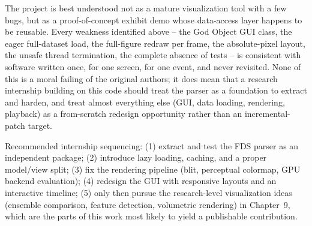 \documentclass[11pt,a4paper]{report}
\begin{document}
\begin{interpbox}
The project is best understood not as a mature visualization tool with a few bugs, but as a
proof-of-concept exhibit demo whose data-access layer happens to be reusable. Every weakness
identified above -- the God Object GUI class, the eager full-dataset load, the full-figure redraw per
frame, the absolute-pixel layout, the unsafe thread termination, the complete absence of tests -- is
consistent with software written once, for one screen, for one event, and never revisited. None of
this is a moral failing of the original authors; it does mean that a research internship building on
this code should treat the parser as a foundation to extract and harden, and treat almost everything
else (GUI, data loading, rendering, playback) as a from-scratch redesign opportunity rather than an
incremental-patch target.
\end{interpbox}

\begin{recbox}
Recommended internship sequencing: (1) extract and test the FDS parser as an independent package; (2)
introduce lazy loading, caching, and a proper model/view split; (3) fix the rendering pipeline (blit,
perceptual colormap, GPU backend evaluation); (4) redesign the GUI with responsive layouts and an
interactive timeline; (5) only then pursue the research-level visualization ideas (ensemble
comparison, feature detection, volumetric rendering) in Chapter~9, which are the parts of this work
most likely to yield a publishable contribution.
\end{recbox}
\end{document}
